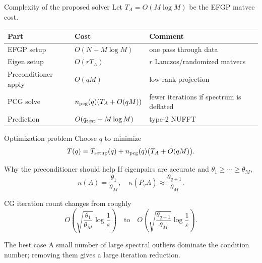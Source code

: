 \documentclass[aspectratio=169,10pt]{beamer}
\begin{document}
\begin{frame}{Complexity of the proposed solver}
Let $T_A=O(M\log M)$ be the EFGP matvec cost.

\begin{center}
\begin{tabular}{lll}
\toprule
Part & Cost & Comment \\
\midrule
EFGP setup & $O(N+M\log M)$ & one pass through data \\
Eigen setup & $O(rT_A)$ & $r$ Lanczos/randomized matvecs \\
Preconditioner apply & $O(qM)$ & low-rank projection \\
PCG solve & $n_{\rm pcg}(q)(T_A+O(qM))$ & fewer iterations if spectrum is deflated \\
Prediction & $O(q_{\rm test}+M\log M)$ & type-2 NUFFT \\
\bottomrule
\end{tabular}
\end{center}

\begin{block}{Optimization problem}
Choose $q$ to minimize
\[
T(q)=T_{\rm setup}(q)+n_{\rm pcg}(q)\bigl(T_A+O(qM)\bigr).
\]
\end{block}
\end{frame}

\begin{frame}{Why the preconditioner should help}
If eigenpairs are accurate and $\theta_1\ge\cdots\ge\theta_M$,
\[
\kappa(A)=\frac{\theta_1}{\theta_M},
\quad
\kappa(P_qA)\approx\frac{\theta_{q+1}}{\theta_M}.
\]

CG iteration count changes from roughly
\[
O\!\left(\sqrt{\frac{\theta_1}{\theta_M}}\log\frac{1}{\varepsilon}\right)
\quad\text{to}\quad
O\!\left(\sqrt{\frac{\theta_{q+1}}{\theta_M}}\log\frac{1}{\varepsilon}\right).
\]

\begin{block}{The best case}
A small number of large spectral outliers dominate the condition number; removing them gives a large iteration reduction.
\end{block}
\end{frame}
\end{document}
